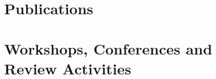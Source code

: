 \documentclass[10pt,a4paper,sans]{moderncv}
\begin{document}
\makecvtitle

\section{Publications}



\section{Workshops, Conferences and Review Activities}


\clearpage
\end{document}
